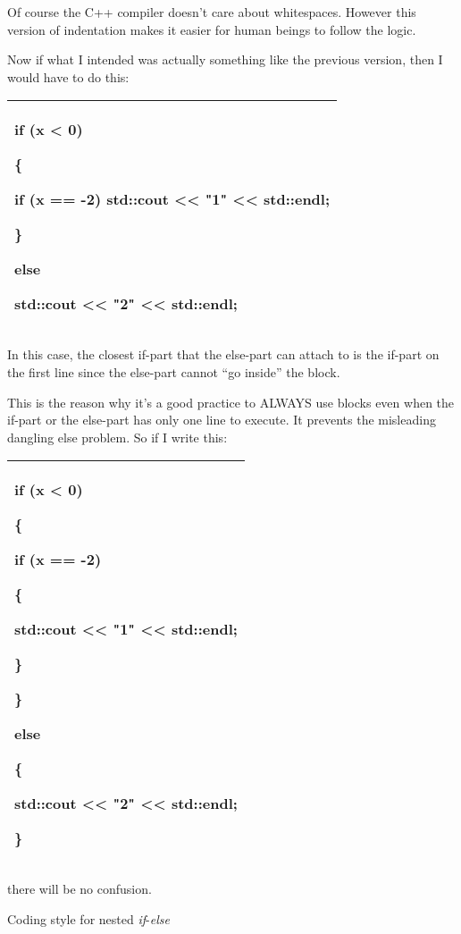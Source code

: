\documentclass[
]{article}
\begin{document}
Of course the C++ compiler doesn't care about whitespaces. However this
version of indentation makes it easier for human beings to follow the
logic.

Now if what I intended was actually something like the previous version,
then I would have to do this:

\begin{longtable}[]{@{}l@{}}
\toprule
\endhead
\begin{minipage}[t]{0.97\columnwidth}\raggedright
if (x \textless{} 0)

\{

if (x == -2) std::cout \textless\textless{} "1" \textless\textless{}
std::endl;

\}

else

std::cout \textless\textless{} "2" \textless\textless{} std::endl;\strut
\end{minipage}\tabularnewline
\bottomrule
\end{longtable}

In this case, the closest if-part that the else-part can attach to is
the if-part on the first line since the else-part cannot ``go inside''
the block.

This is the reason why it's a good practice to ALWAYS use blocks even
when the if-part or the else-part has only one line to execute. It
prevents the misleading dangling else problem. So if I write this:

\begin{longtable}[]{@{}l@{}}
\toprule
\endhead
\begin{minipage}[t]{0.97\columnwidth}\raggedright
if (x \textless{} 0)

\{

if (x == -2)

\{

std::cout \textless\textless{} "1" \textless\textless{} std::endl;

\}

\}

else

\{

std::cout \textless\textless{} "2" \textless\textless{} std::endl;

\}\strut
\end{minipage}\tabularnewline
\bottomrule
\end{longtable}

there will be no confusion.

Coding style for nested \emph{if}-\emph{else}
\end{document}
